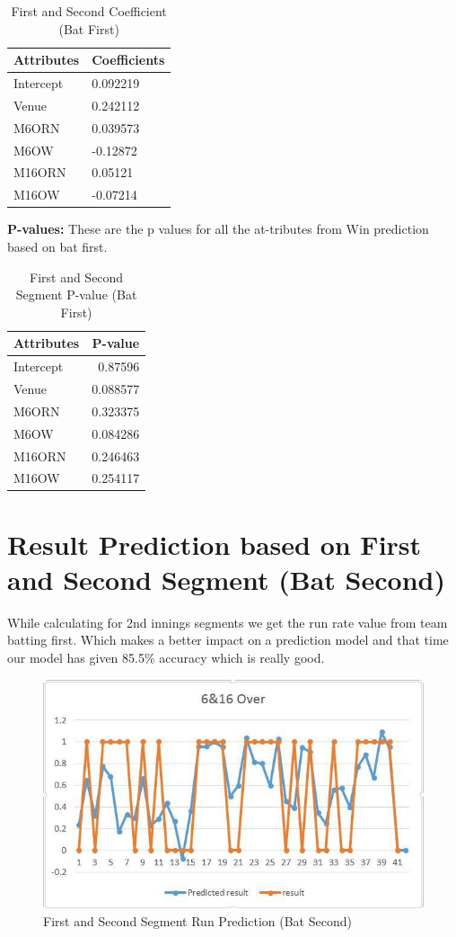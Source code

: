 \begin{table}[htbp]
\centering
\begin{tabular}{l | l}
Attributes & Coefficients\\
\hline
Intercept & 0.092219\\
Venue & 0.242112\\
M6ORN & 0.039573\\
M6OW & -0.12872\\
M16ORN & 0.05121\\
M16OW & -0.07214
\end{tabular}
\caption{First and Second Coefficient (Bat First)}
\label{tab:First and Second Coefficient (Bat First)}
\end{table}

\textbf{P-values:} These are the p values for all the at-tributes from Win prediction based on bat first.

\begin{table}[htbp]
\centering
\begin{tabular}{|l | r|}
\hline
Attributes & P-value\\
\hline
Intercept & 0.87596\\
\hline
Venue & 0.088577\\
\hline
M6ORN & 0.323375\\
\hline
M6OW & 0.084286\\
\hline
M16ORN & 0.246463\\
\hline
M16OW & 0.254117\\
\hline
\end{tabular}
\caption{First and Second Segment P-value (Bat First)}
\label{tab:First and Second Segment P-value (Bat First)}
\end{table}

\section{Result Prediction based on First and Second Segment (Bat Second)} 
While calculating for 2nd innings segments we get the run rate value from team batting first. Which makes a better impact on a prediction model and that time our model has given 85.5\% accuracy which is really good.

\begin{figure}[htbp]
\centering
\includegraphics[scale=0.5]{images/fig-18.jpg}
\caption{First and Second Segment Run Prediction (Bat Second)}
\label{fig:x Frist and Second Segment Run Prediction (Bat Second)}
\end{figure}

